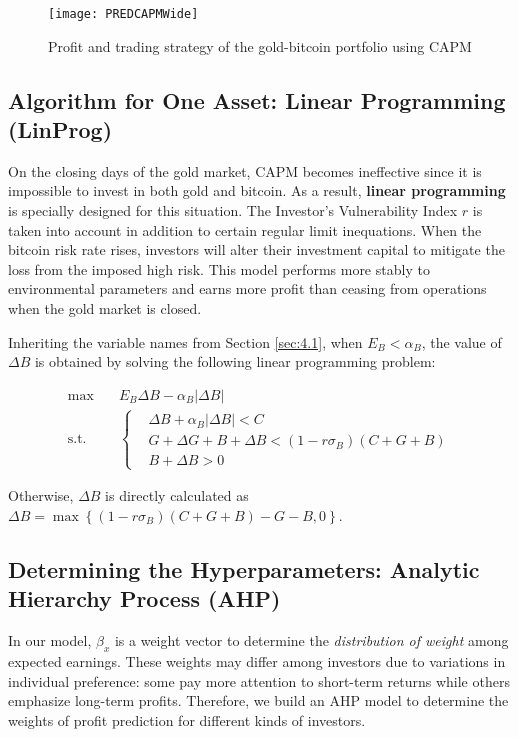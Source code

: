 \documentclass{mcmthesis}
\begin{document}
	\begin{figure}[h]
		\label{fig:13}
		\centering \texttt{[image: PREDCAPMWide]}
		\caption{Profit and trading strategy of the gold-bitcoin portfolio using CAPM}
	\end{figure}
	
	\subsection{Algorithm for One Asset: Linear Programming (LinProg)}
	\label{sec:4.2}
	
	On the closing days of the gold market, CAPM becomes ineffective since it is impossible to invest in both gold and bitcoin. As a result, \textbf{linear programming} is specially designed for this situation. The Investor's Vulnerability Index $r$ is taken into account in addition to certain regular limit inequations. When the bitcoin risk rate rises, investors will alter their investment capital to mitigate the loss from the imposed high risk. This model performs more stably to environmental parameters and earns more profit than ceasing from operations when the gold market is closed. 
	
	Inheriting the variable names from Section \ref{sec:4.1}, when $E_B < \alpha_B$, the value of $\Delta B$ is obtained by solving the following linear programming problem: 
	
	$$
	\begin{aligned}
		\max \quad & E_B \Delta B - \alpha_B |\Delta B| \\
		\textrm{s.t.} \quad & \left\{
		\begin{aligned}
			& \Delta B + \alpha_B |\Delta B| < C \\
			& G + \Delta G + B + \Delta B < \left(1-r\sigma_B\right) \left(C+G+B\right) \\
			& B + \Delta B > 0
		\end{aligned}
		\right.
	\end{aligned}
	$$
	
	Otherwise, $\Delta B$ is directly calculated as $\Delta B = \max \left\{ \left( 1-r\sigma_B \right) \left(C+G+B\right) - G - B, 0 \right\}$. 
	
	\subsection{Determining the Hyperparameters: Analytic Hierarchy Process (AHP)}
	\label{sec:4.3}
	
	In our model, $\beta_x$ is a weight vector to determine the \textit{distribution of weight} among expected earnings. These weights may differ among investors due to variations in individual preference: some pay more attention to short-term returns while others emphasize long-term profits. Therefore, we build an AHP model to determine the weights of profit prediction for different kinds of investors. 
	
\end{document}
